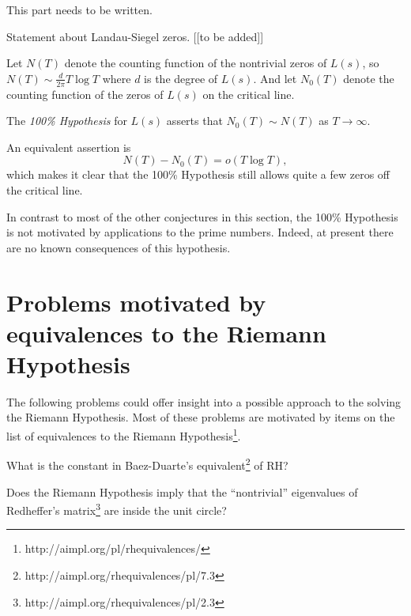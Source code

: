 \documentclass[12pt,letterpaper, reqno]{aimpl}
\newcommand{\htmladdnormallink}[2]{{#1}\footnote{#2}}
\begin{document}
\begin{problemblock}

This part needs to be written.

\begin{problem}[2.3]  Statement about Landau-Siegel zeros. [[to be added]]
\end{problem}

\end{problemblock}


\begin{problemblock}

Let $N(T)$ denote the counting function of the nontrivial
zeros of $L(s)$, so $N(T)\sim \frac{d}{2\pi}T\log T$
where $d$ is the degree of $L(s)$.  And let
$N_0(T)$ denote the counting function of the
zeros of $L(s)$ on the critical line.

\begin{problem}[2.8]
The \emph{100\% Hypothesis} for $L(s)$
asserts that $N_0(T)\sim N(T)$ as $T\to \infty$.
\end{problem}

An equivalent assertion is
$$
N(T)- N_0(T) = o(T\log T) ,
$$
which makes it clear that the 100\% Hypothesis still
allows quite a few zeros off the critical line.


\begin{remark}
In contrast to most of the other conjectures in
this section, the 100\% Hypothesis is not motivated
by applications to the prime numbers.   
Indeed, at
present there are no known consequences of
this hypothesis.
\end{remark}

\end{problemblock}

\section{Problems motivated by equivalences to the Riemann Hypothesis}

The following problems could offer insight into a possible approach
to the solving the Riemann Hypothesis.  Most of these problems
are motivated by items on the 
\htmladdnormallink{list of equivalences to
the Riemann Hypothesis}{http://aimpl.org/pl/rhequivalences/}.

 \begin{problemblock}
\begin{problem}[3.1]
What is the constant in 
\htmladdnormallink{Baez-Duarte's equivalent}{http://aimpl.org/rhequivalences/pl/7.3} of RH?
\end{problem}
\end{problemblock}

\begin{problemblock}
\begin{problem}[3.2]
Does the Riemann Hypothesis imply that the ``nontrivial'' eigenvalues
of \htmladdnormallink{Redheffer's matrix}{http://aimpl.org/rhequivalences/pl/2.3}
are inside the unit circle?
\end{problem}
\end{problemblock}
\end{document}
